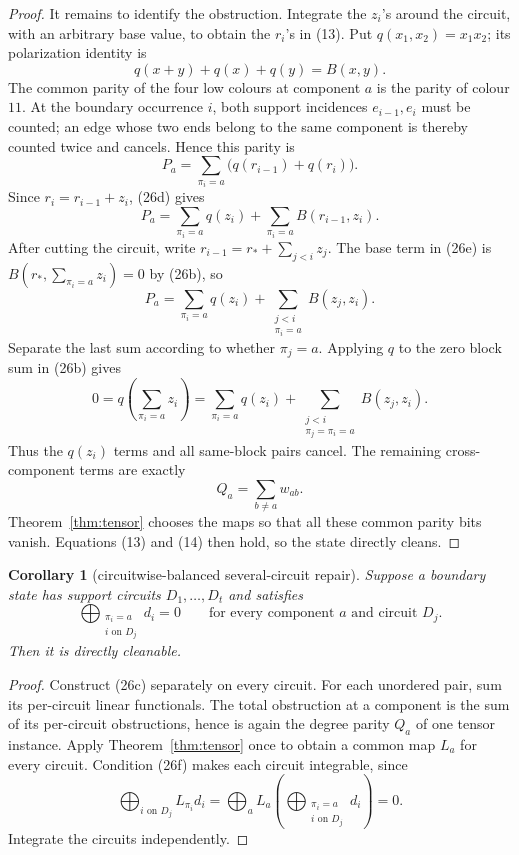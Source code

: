 \documentclass[11pt]{article}
\newtheorem{corollary}[theorem]{Corollary}
\theoremstyle{definition}
\theoremstyle{remark}
\begin{document}
\begin{proof}
It remains to identify the obstruction.  Integrate the \(z_i\)'s around
the circuit, with an arbitrary base value, to obtain the \(r_i\)'s in
(13).  Put \(q(x_1,x_2)=x_1x_2\); its polarization identity is
\[
                     q(x+y)+q(x)+q(y)=B(x,y).            \tag{26d}
\]
The common parity of the four low colours at component \(a\) is the
parity of colour \(11\).  At the boundary occurrence \(i\), both support
incidences \(e_{i-1},e_i\) must be counted; an edge whose two ends belong
to the same component is thereby counted twice and cancels.  Hence this
parity is
\[
 P_a=\sum_{\pi_i=a}\bigl(q(r_{i-1})+q(r_i)\bigr).
\]
Since \(r_i=r_{i-1}+z_i\), (26d) gives
\[
 P_a=\sum_{\pi_i=a}q(z_i)
     +\sum_{\pi_i=a}B(r_{i-1},z_i).                     \tag{26e}
\]
After cutting the circuit, write
\(r_{i-1}=r_*+\sum_{j<i}z_j\).  The base term in (26e) is
\(B(r_*,\sum_{\pi_i=a}z_i)=0\) by (26b), so
\[
 P_a=\sum_{\pi_i=a}q(z_i)
    +\sum_{\substack{j<i\\\pi_i=a}}B(z_j,z_i).
\]
Separate the last sum according to whether \(\pi_j=a\).  Applying
\(q\) to the zero block sum in (26b) gives
\[
 0=q\left(\sum_{\pi_i=a}z_i\right)
  =\sum_{\pi_i=a}q(z_i)
   +\sum_{\substack{j<i\\\pi_j=\pi_i=a}}B(z_j,z_i).
\]
Thus the \(q(z_i)\) terms and all same-block pairs cancel.  The remaining
cross-component terms are exactly
\[
                              Q_a=\sum_{b\ne a}w_{ab}.
\]
Theorem~\ref{thm:tensor} chooses the maps so that all these common parity
bits vanish.  Equations (13) and (14) then hold, so the state directly
cleans.
\end{proof}

\begin{corollary}[circuitwise-balanced several-circuit repair]
\label{cor:multicircuittensor}
Suppose a boundary state has support circuits \(D_1,\ldots,D_t\) and
satisfies
\[
        \bigoplus_{\substack{\pi_i=a\\i\text{ on }D_j}}d_i=0
        \qquad\text{for every component \(a\) and circuit \(D_j\)}.
                                                               \tag{26f}
\]
Then it is directly cleanable.
\end{corollary}

\begin{proof}
Construct (26c) separately on every circuit.  For each unordered pair,
sum its per-circuit linear functionals.  The total obstruction at a
component is the sum of its per-circuit obstructions, hence is again the
degree parity \(Q_a\) of one tensor instance.  Apply
Theorem~\ref{thm:tensor} once to obtain a common map \(L_a\) for every
circuit.  Condition (26f) makes each circuit integrable, since
\[
 \bigoplus_{i\text{ on }D_j}L_{\pi_i}d_i
 =\bigoplus_a L_a
   \left(\bigoplus_{\substack{\pi_i=a\\i\text{ on }D_j}}d_i\right)=0.
\]
Integrate the circuits independently.
\end{proof}
\end{document}
